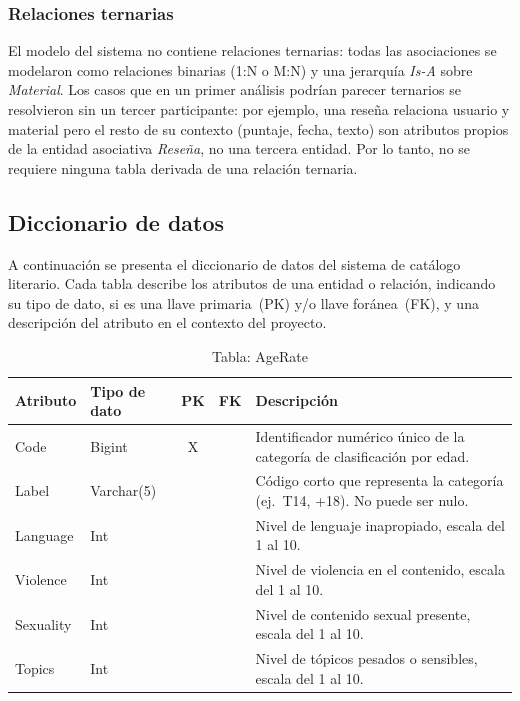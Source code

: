 \documentclass[12pt,a4paper]{article}
\begin{document}
\subsubsection{Relaciones ternarias}

El modelo del sistema no contiene relaciones ternarias: todas las asociaciones
se modelaron como relaciones binarias (1:N o M:N) y una jerarquía
\textit{Is-A} sobre \textit{Material}. Los casos que en un primer análisis
podrían parecer ternarios se resolvieron sin un tercer participante: por
ejemplo, una reseña relaciona usuario y material pero el resto de su contexto
(puntaje, fecha, texto) son atributos propios de la entidad asociativa
\textit{Reseña}, no una tercera entidad. Por lo tanto, no se requiere ninguna
tabla derivada de una relación ternaria.


\subsection{Diccionario de datos}

A continuación se presenta el diccionario de datos del sistema de catálogo
literario. Cada tabla describe los atributos de una entidad o relación,
indicando su tipo de dato, si es una llave primaria~(PK) y/o
llave foránea~(FK), y una descripción del atributo en el contexto del proyecto.


\begin{table}[H]
\centering
\begin{tabularx}{\textwidth}{|l|l|c|c|X|}
\hline
\textbf{Atributo} & \textbf{Tipo de dato} & \textbf{PK} & \textbf{FK} & \textbf{Descripción} \\ \hline
Code     & Bigint     & X & & Identificador numérico único de la categoría de clasificación por edad. \\ \hline
Label    & Varchar(5) & & & Código corto que representa la categoría (ej.\ T14, +18). No puede ser nulo. \\ \hline
Language & Int        & & & Nivel de lenguaje inapropiado, escala del 1 al 10. \\ \hline
Violence & Int        & & & Nivel de violencia en el contenido, escala del 1 al 10. \\ \hline
Sexuality & Int       & & & Nivel de contenido sexual presente, escala del 1 al 10. \\ \hline
Topics   & Int        & & & Nivel de tópicos pesados o sensibles, escala del 1 al 10. \\ \hline
\end{tabularx}
\caption{Tabla: AgeRate}
\end{table}
\end{document}
